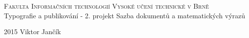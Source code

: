\begin{titlepage}
\begin{center}
\linespread{0}
\Huge
\textsc{\Huge Fakulta Informačních technologií \linebreak Vysoké učení technické v Brně} \\
{\LARGE Typografie a publikování - 2. projekt \linebreak
Sazba dokumentů a matematických výrazů}
\end{center}
{\Large 2015 \hfill
Viktor Jančík}
\end{titlepage}